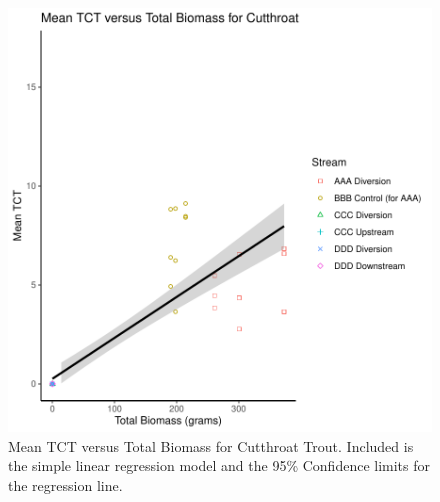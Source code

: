 \begin{figure}[H]
\includegraphics{AppendixImages/model_CT.pdf}
\caption{  \hspace{1mm}  Mean TCT versus Total Biomass for Cutthroat Trout. Included is the simple linear regression model and the 95\% Confidence limits for the regression line.}
\label{fig:ctanalysis}
\end{figure}



